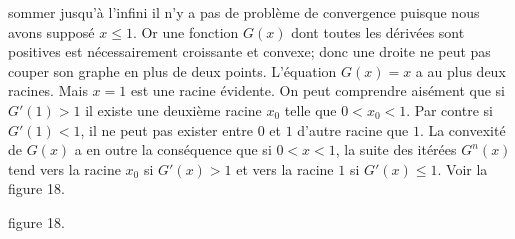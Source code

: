 sommer jusqu'\`a l'infini il n'y a pas de probl\`eme de convergence
puisque nous avons suppos\'e $x \leq 1$. Or une fonction $G(x)$ dont
toutes les  d\'eriv\'ees sont positives est n\'ecessairement croissante
et convexe; donc une droite ne peut pas couper son graphe en plus de
deux points. L'\'equation $G(x) = x$ a au plus deux racines. Mais $x = 1$
est une racine \'evidente. On peut comprendre ais\'ement que si $G'(1) >
1$ il existe une deuxi\`eme racine $x_0$ telle que $0 < x_0 < 1$. Par
contre si $G'(1) < 1$, il ne peut pas exister entre $0$ et $1$ d'autre
racine que $1$. La convexit\'e de $G(x)$ a en outre la cons\'equence que
si $0 < x < 1$, la suite des it\'er\'ees $G^n(x)$ tend vers la racine $x_0$
si $G'(x) > 1$ et vers la racine $1$ si $G'(x) \leq 1$. Voir la figure 18.

\midinsert
\vskip3pt
\centerline{ }
\centerline{\eightpoint figure 18.}
\endinsert

